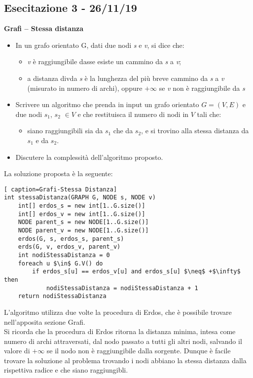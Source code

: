 \documentclass[../cheatSheetAlgoritmi.tex]{subfiles}
\begin{document}
\subsection{Esecitazione 3 - 26/11/19}
\textbf{Grafi – Stessa distanza} \\
\begin{itemize}
\item In un grafo orientato G, dati due nodi \textit{s} e \textit{v}, si dice che:
	\begin{itemize}
		\item \textit{v} è raggiungibile dasse esiste un cammino da \textit{s} a \textit{v};
		\item a distanza divda \textit{s} è la lunghezza del più breve cammino da \textit{s} a \textit{v} (misurato in numero di archi), oppure $+\infty$ se \textit{v} non è raggiungibile da \textit{s}
	\end{itemize}
	
	\item Scrivere un algoritmo che prenda in input un grafo orientato $G=(V, E)$ e due nodi $s_1$, $s_2$ $\in V$ e che restituisca il numero di nodi in $V$ tali che:
	\begin{itemize}
		\item siano raggiungibili sia da $s_1$ che da $s_2$, e si trovino alla stessa distanza da $s_1$ e da $s_2$.
	\end{itemize}
	\item Discutere la complessità dell’algoritmo proposto.
\end{itemize}
La soluzione proposta è la seguente:
\begin{lstlisting}[ caption=Grafi-Stessa Distanza]
int stessaDistanza(GRAPH G, NODE s, NODE v)
	int[] erdos_s = new int[1..G.size()]
  	int[] erdos_v = new int[1..G.size()]
  	NODE parent_s = new NODE[1..G.size()]
 	NODE parent_v = new NODE[1..G.size()]
 	erdos(G, s, erdos_s, parent_s)
 	erds(G, v, erdos_v, parent_v)
  	int nodiStessaDistanza = 0
  	foreach u $\in$ G.V() do
    	if erdos_s[u] == erdos_v[u] and erdos_s[u] $\neq$ +$\infty$ then
      		nodiStessaDistanza = nodiStessaDistanza + 1
  	return nodiStessaDistanza
\end{lstlisting}
L'algoritmo utilizza due volte la procedura di Erdos, che è possibile trovare nell'apposita sezione Grafi. \\ Si ricorda che la procedura di Erdos ritorna la distanza minima, intesa come numero di archi attraversati, dal nodo passato a tutti gli altri nodi, salvando il valore di $+\infty$ se il nodo non è raggiungibile dalla sorgente. Dunque è facile trovare la soluzione al problema trovando i nodi abbiano la stessa distanza dalla rispettiva radice e che siano raggiungibli.
\end{document}
